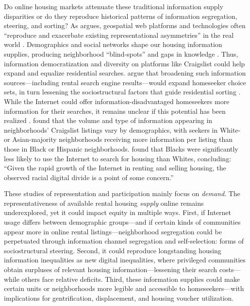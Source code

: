 \documentclass[11pt,letterpaper]{article}
\begin{document}
Do online housing markets attenuate these traditional information supply disparities or do they reproduce historical patterns of information segregation, steering, and sorting? As \citet[][p. 993]{stephens_gender_2013} argues, geospatial web platforms and technologies often \enquote{reproduce and exacerbate existing representational asymmetries} in the real world \cite[cf.][]{elwood_geographic_2010,mattern_interfacing_2014,thatcher_revisiting_2016,leszczynski_speculative_2016,brannon_datafied_2017}. Demographics and social networks shape our housing information supplies, producing neighborhood \enquote{blind-spots} and gaps in knowledge \citep{krysan_racial_2009}. Thus, information democratization and diversity on platforms like Craigslist could help expand and equalize residential searches. \citet{krysan_cycle_2017} argue that broadening such information sources---including rental search engine results---would expand homeseeker choice sets, in turn lessening the sociostructural factors that guide residential sorting \citep[cf.][]{sampson_neighborhood_2008,steil_household_2018}. While the Internet could offer information-disadvantaged homeseekers more information for their searches, it remains unclear if this potential has been realized \citep{palm_residential_2001,decker_housing_2010}. \citet{besbris_language_2018} found that the volume and type of information appearing in neighborhoods' Craigslist listings vary by demographics, with seekers in White- or Asian-majority neighborhoods receiving more information per listing than those in Black or Hispanic neighborhoods. \citet[][p.~598]{krysan_does_2008} found that Blacks were significantly less likely to use the Internet to search for housing than Whites, concluding: \enquote{Given the rapid growth of the Internet in renting and selling housing, the observed racial digital divide is a point of some concern.}

These studies of representation and participation mainly focus on \emph{demand}. The representativeness of available rental housing \emph{supply} online remains underexplored, yet it could impact equity in multiple ways. First, if Internet usage differs between demographic groups---and if certain kinds of communities appear more in online rental listings---neighborhood segregation could be perpetuated through information channel segregation and self-selection: forms of sociostructural steering. Second, it could reproduce longstanding housing information inequalities as new digital inequalities, where privileged communities obtain surpluses of relevant housing information---lessening their search costs---while others face relative deficits. Third, these information supplies could make certain units or neighborhoods more legible and accessible to homeseekers---with implications for gentrification, displacement, and housing voucher utilization.
\end{document}

